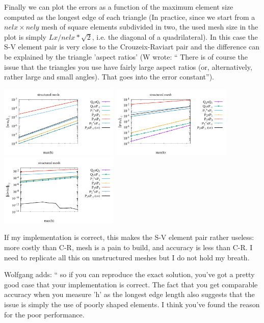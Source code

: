 Finally we can plot the errors as a function of the maximum element size computed as the longest 
edge of each triangle (In practice, since we start from a $nelx \times nely$ mesh 
of square elements subdivided in two, the used mesh size in the plot is simply $Lx/nelx*\sqrt{2}$, i.e.
the diagonal of a quadrilateral). 
In this case the S-V element pair is very close to the Crouzeix-Raviart pair and the difference 
can be explained by the triangle 'aspect ratios' (W wrote: ``
There is of course the issue that the triangles you use have fairly large
aspect ratios (or, alternatively, rather large and small angles). That goes
into the error constant'').
\begin{center}
\includegraphics[width=5.7cm]{python_codes/fieldstone_120/paperresults/plin_structured_errorsV3.pdf}
\includegraphics[width=5.7cm]{python_codes/fieldstone_120/paperresults/plin_structured_errorsP3.pdf}
\includegraphics[width=5.7cm]{python_codes/fieldstone_120/paperresults/plin_structured_errors_divv3.pdf}
\end{center}

If my implementation is correct, this makes the S-V element pair rather useless:
more costly than C-R, mesh is a pain to build, and accuracy is less than C-R.
I need to replicate all this on unstructured meshes but I do not hold my breath.

Wolfgang adds:
``
so if you can reproduce the exact solution, you've got a pretty good case that
your implementation is correct. The fact that you get comparable accuracy when
you measure 'h' as the longest edge length also suggests that the issue is
simply the use of poorly shaped elements. I think you've found the reason for
the poor performance.

